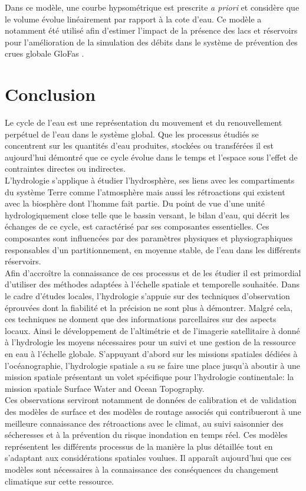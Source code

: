 Dans ce modèle, une courbe hypsométrique est prescrite \textit{a priori} et considère que le volume évolue linéairement par rapport à la cote d'eau.
Ce modèle a notamment été utilisé afin d'estimer l'impact de la présence des lacs et réservoirs pour l'amélioration de la simulation des débits dans le système de prévention des crues globale GloFas \citep{alfieri2013}.
\clearpage

\section{{\selectfont Conclusion}}

Le cycle de l'eau est une représentation du mouvement et du renouvellement perpétuel de l'eau dans le système global. Que les processus étudiés se concentrent sur les quantités d'eau produites, stockées ou transférées il est aujourd'hui démontré que ce cycle évolue dans le temps et l'espace sous l'effet de contraintes directes ou indirectes. \\
L'hydrologie s'applique à étudier l'hydrosphère, ses liens avec les compartiments du système Terre comme l'atmosphère mais aussi les rétroactions qui existent avec la biosphère dont l'homme fait partie.
Du point de vue d'une unité hydrologiquement close telle que le bassin versant, le bilan d'eau, qui décrit les échanges de ce cycle, est caractérisé par ses composantes essentielles. Ces composantes sont influencées par des paramètres physiques et physiographiques responsables d'un partitionnement, en moyenne stable, de l'eau dans les différents réservoirs. \\
Afin d'accroître la connaissance de ces processus et de les étudier il est primordial d'utiliser des méthodes adaptées à l'échelle spatiale et temporelle souhaitée. Dans le cadre d'études locales, l'hydrologie s'appuie sur des techniques d'observation éprouvées dont la fiabilité et la précision ne sont plus à démontrer. Malgré cela, ces techniques ne donnent que des informations parcellaires sur des aspects locaux. Ainsi le développement de l'altimétrie et de l'imagerie satellitaire à donné à l'hydrologie les moyens nécessaires pour un suivi et une gestion de la ressource en eau à l'échelle globale. S'appuyant d'abord sur les missions spatiales dédiées à l'océanographie, l'hydrologie spatiale a su se faire une place jusqu'à aboutir à une mission spatiale présentant un volet spécifique pour l'hydrologie continentale: la mission spatiale Surface Water and Ocean Topography.\\
Ces observations serviront notamment de données de calibration et de validation des modèles de surface et des modèles de routage associés qui contribueront à une meilleure connaissance des rétroactions avec le climat, au suivi saisonnier des sécheresses et à la prévention du risque inondation en temps réel. Ces modèles représentent les différents processus de la manière la plus détaillée tout en s'adaptant aux considérations spatiales voulues. Il apparaît aujourd'hui que ces modèles sont nécessaires à la connaissance des conséquences du changement climatique sur cette ressource.\\

